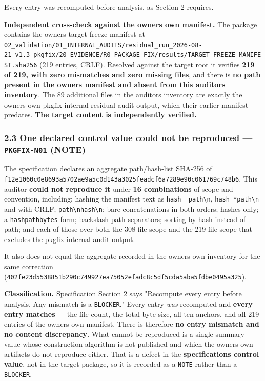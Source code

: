 \documentclass[
  9pt,
  a4paper,
]{article}
\begin{document}
Every entry was recomputed before analysis, as Section 2 requires.

\textbf{Independent cross-check against the owner\textquotesingle s own
manifest.} The package contains the owner\textquotesingle s target
freeze manifest at
\texttt{02\_validation/01\_INTERNAL\_AUDITS/residual\_run\_2026-08-21\_v1.3\_pkgfix/20\_EVIDENCE/R0\_PACKAGE\_FIX/results/TARGET\_FREEZE\_MANIFEST.sha256}
(219 entries, CRLF). Resolved against the target root it verifies
\textbf{219 of 219, with zero mismatches and zero missing files}, and
there is \textbf{no path present in the owner\textquotesingle s manifest
and absent from this auditor\textquotesingle s inventory}. The 89
additional files in the auditor\textquotesingle s inventory are exactly
the owner\textquotesingle s own pkgfix internal-residual-audit output,
which their earlier manifest predates. \textbf{The target content is
independently verified.}

\subsubsection{\texorpdfstring{2.3 One declared control value could not
be reproduced --- \texttt{PKGFIX-N01}
(NOTE)}{2.3 One declared control value could not be reproduced --- PKGFIX-N01 (NOTE)}}\label{23-one-declared-control-value-could-not-be-reproduced--pkgfix-n01-note}

The specification declares an aggregate path/hash-list SHA-256 of
\texttt{f12e1060c0e8693a5702ae9a5c0d143a3025feadcf6a7289e90c061769c748b6}.
This auditor \textbf{could not reproduce it} under \textbf{16
combinations} of scope and convention, including: hashing the manifest
text as \texttt{hash\ \ path\textbackslash{}n},
\texttt{hash\ *path\textbackslash{}n} and with CRLF;
\texttt{path\textbackslash{}nhash\textbackslash{}n}; bare concatenations
in both orders; hashes only; a
\texttt{hash\textbar{}path\textbar{}bytes} form; backslash path
separators; sorting by hash instead of path; and each of those over both
the 308-file scope and the 219-file scope that excludes the pkgfix
internal-audit output.

It also does not equal the aggregate recorded in the
owner\textquotesingle s own inventory for the same correction
(\texttt{402fe23d5538851b290c749927ea75052efadc8c5df5cda5aba5fdbe0495a325}).

\textbf{Classification.} Specification Section 2 says "Recompute every
entry before analysis. Any mismatch is a \texttt{BLOCKER}." Every entry
\emph{was} recomputed and \textbf{every entry matches} --- the file
count, the total byte size, all ten anchors, and all 219 entries of the
owner\textquotesingle s own manifest. There is therefore \textbf{no
entry mismatch and no content discrepancy}. What cannot be reproduced is
a single summary value whose construction algorithm is not published and
which the owner\textquotesingle s own artifacts do not reproduce either.
That is a defect in the \textbf{specification\textquotesingle s control
value}, not in the target package, so it is recorded as a \texttt{NOTE}
rather than a \texttt{BLOCKER}.
\end{document}
